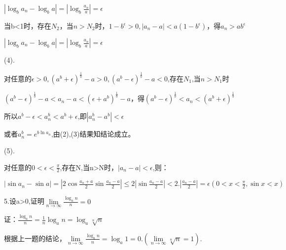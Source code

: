 \documentclass[12pt]{ctexart}
\begin{document}
$|\log_b{a_n}-\log_b{a}|=|\log_b{\frac{a_n}{a}}|=\epsilon$

当b<1时，存在$N_2$，当$n>N_2$时，$1-b^{\epsilon}>0,|a_n-a|<a(1-b^{\epsilon})$，得$a_n>ab^{\epsilon}$

$|\log_b{a_n}-\log_b{a}|=|\log_b{\frac{a_n}{a}}|=\epsilon$

(4).

对任意的$\epsilon>0,(a^b+\epsilon)^{\frac{1}{b}}-a>0,(a^b-\epsilon)^{\frac{1}{b}}-a<0$,存在$N_1$,当$n>N_1$时

$(a^b-\epsilon)^{\frac{1}{b}}-a<a_n-a<(\epsilon+a^b)^{\frac{1}{b}}-a$，得$(a^b-\epsilon)^{\frac{1}{b}}<a_n<(a^b+\epsilon)^{\frac{1}{b}}$

所以$a^b-\epsilon<a_n^b<a^b+\epsilon$,即$|a_n^b-a^b|<\epsilon$

或者$a_n^b=e^{b\ln{a_n}}$,由(2),(3)结果知结论成立。

(5).

对任意的$0<\epsilon<\frac{\pi}{2}$,存在N,当n>N时，$|a_n-a|<\epsilon$,则：

$|\sin{a_n}-\sin{a}|=|2\cos\frac{a_n+a}{2}\sin\frac{a_n-a}{2}|\le2|\sin\frac{a_n-a}{2}|<2.|\frac{a_n-a}{2}|=\epsilon(0<x<\frac{\pi}{2},\sin{x}<x)$


5.设a>0,证明$\lim\limits_{n\to\infty}{\frac{\log_an}{n}}=0$

证：$\frac{\log_a{n}}{n}=\frac{1}{n}\log_a{n}=\log_a{\sqrt[n]{n}}$

根据上一题的结论，$\lim\limits_{n\to\infty}{\frac{\log_an}{n}}=\log_a{1}=0.(\lim\limits_{n\to\infty}\sqrt[n]{n}=1)$.
\end{document}
